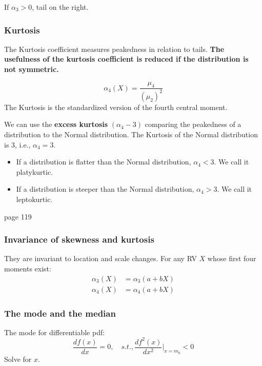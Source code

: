 \documentclass[12pt]{article}
\newcommand{\incfig}[1]{%
\def\svgwidth{\columnwidth}
{#1.pdf_tex}
}
\begin{document}
If $ \alpha_3 > 0 $, tail on the right.
\begin{figure}[ht]
    \centering
		\scalebox{.7}{\incfig{right-tail}}
    \label{fig:right-tail}
\end{figure}



\subsubsection{Kurtosis}
The Kurtosis coefficient measures peakedness in relation to tails. 
{\textbf {The usefulness of the kurtosis coefficient is reduced if the distribution
is not symmetric.}}

\begin{equation*}
\alpha_4(X) = \frac{\mu_4}{(\mu_2)^{2}}
\end{equation*}
The Kurtosis is the standardized version of the fourth central moment.

We can use the {\textbf {excess kurtosis}} $ (\alpha_4 - 3) $ comparing the peakedness
of a distribution to the Normal distribution.
The Kurtosis of the Normal distribution is 3, i.e., $ \alpha_4 = 3 $.


\begin{itemize}
\item If a distribution is flatter than the Normal distribution, $ \alpha_4 < 3 $.
We call it platykurtic.
\item If a distribution is steeper than the Normal distribution, $ \alpha_4 > 3 $.
We call it leptokurtic.
\end{itemize}
page 119


\subsubsection{Invariance of skewness and kurtosis}

They are invariant to location and scale changes.
For any RV $ X $ whose first four moments exist:
\begin{align*}
\alpha_3(X) &= \alpha_3(a + bX)\\
\alpha_4(X) &= \alpha_4(a + bX)
\end{align*}

\subsubsection{The mode and the median}

The mode for differentiable pdf:
\begin{equation*}
\frac{df(x)}{dx} = 0, \quad s.t., \frac{df^{2}(x)}{dx^{2}}\Bigg|_{x = m_0} < 0
\end{equation*}
Solve for $ x $.
\end{document}
